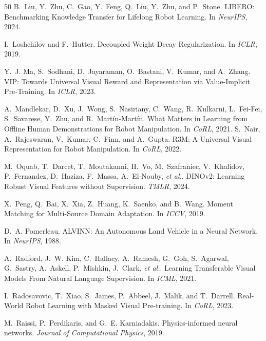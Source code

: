 \documentclass{article}
\newcommand{\etal}{\textit{et al.}}
\begin{document}
{\begin{thebibliography}{50}
B.~Liu, Y.~Zhu, C.~Gao, Y.~Feng, Q.~Liu, Y.~Zhu, and P.~Stone.
\newblock LIBERO: Benchmarking Knowledge Transfer for Lifelong Robot Learning.
\newblock In \emph{NeurIPS}, 2024.

I.~Loshchilov and F.~Hutter.
\newblock Decoupled Weight Decay Regularization.
\newblock In \emph{ICLR}, 2019.

Y.~J. Ma, S.~Sodhani, D.~Jayaraman, O.~Bastani, V.~Kumar, and A.~Zhang.
\newblock VIP: Towards Universal Visual Reward and Representation via Value-Implicit Pre-Training.
\newblock In \emph{ICLR}, 2023.


A.~Mandlekar, D.~Xu, J.~Wong, S.~Nasiriany, C.~Wang, R.~Kulkarni, L.~Fei-Fei, S.~Savarese, Y.~Zhu, and R.~Mart\'{i}n-Mart\'{i}n.
\newblock What Matters in Learning from Offline Human Demonstrations for Robot Manipulation.
\newblock In \emph{CoRL}, 2021.
S.~Nair, A.~Rajeswaran, V.~Kumar, C.~Finn, and A.~Gupta.
\newblock R3M: A Universal Visual Representation for Robot Manipulation.
\newblock In \emph{CoRL}, 2022.

M.~Oquab, T.~Darcet, T.~Moutakanni, H.~Vo, M.~Szafraniec, V.~Khalidov, P.~Fernandez, D.~Haziza, F.~Massa, A.~El-Nouby, \etal.
\newblock DINOv2: Learning Robust Visual Features without Supervision.
\newblock \emph{TMLR}, 2024.

X.~Peng, Q.~Bai, X.~Xia, Z.~Huang, K.~Saenko, and B.~Wang.
\newblock Moment Matching for Multi-Source Domain Adaptation.
\newblock In \emph{ICCV}, 2019.

D.~A. Pomerleau.
\newblock ALVINN: An Autonomous Land Vehicle in a Neural Network.
\newblock In \emph{NeurIPS}, 1988.

A.~Radford, J.~W. Kim, C.~Hallacy, A.~Ramesh, G.~Goh, S.~Agarwal, G.~Sastry, A.~Askell, P.~Mishkin, J.~Clark, \etal.
\newblock Learning Transferable Visual Models From Natural Language Supervision.
\newblock In \emph{ICML}, 2021.

I.~Radosavovic, T.~Xiao, S.~James, P.~Abbeel, J.~Malik, and T.~Darrell.
\newblock Real-World Robot Learning with Masked Visual Pre-training.
\newblock In \emph{CoRL}, 2023.

M.~Raissi, P.~Perdikaris, and G.~E. Karniadakis.
\newblock Physics-informed neural networks.
\newblock \emph{Journal of Computational Physics}, 2019.


\end{thebibliography}}
\end{document}
